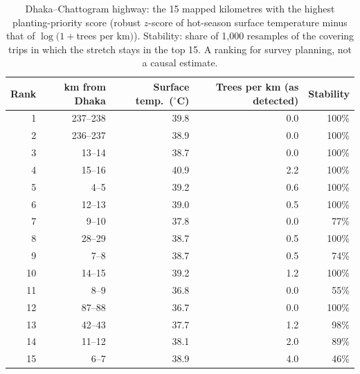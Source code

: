 \begin{table}[t]\centering\footnotesize
\caption{Dhaka--Chattogram highway: the 15 mapped kilometres with the highest planting-priority score (robust $z$-score of hot-season surface temperature minus that of $\log(1+$trees per km$)$). Stability: share of 1,000 resamples of the covering trips in which the stretch stays in the top 15. A ranking for survey planning, not a causal estimate.}\label{tab:priority}
\begin{tabular}{rrrrr}\toprule
Rank & km from Dhaka & Surface temp.\ ($^\circ$C) & Trees per km (as detected) & Stability\\\midrule
1 & 237--238 & 39.8 & 0.0 & 100\%\\
2 & 236--237 & 38.9 & 0.0 & 100\%\\
3 & 13--14 & 38.7 & 0.0 & 100\%\\
4 & 15--16 & 40.9 & 2.2 & 100\%\\
5 & 4--5 & 39.2 & 0.6 & 100\%\\
6 & 12--13 & 39.0 & 0.5 & 100\%\\
7 & 9--10 & 37.8 & 0.0 & 77\%\\
8 & 28--29 & 38.7 & 0.5 & 100\%\\
9 & 7--8 & 38.7 & 0.5 & 74\%\\
10 & 14--15 & 39.2 & 1.2 & 100\%\\
11 & 8--9 & 36.8 & 0.0 & 55\%\\
12 & 87--88 & 36.7 & 0.0 & 100\%\\
13 & 42--43 & 37.7 & 1.2 & 98\%\\
14 & 11--12 & 38.1 & 2.0 & 89\%\\
15 & 6--7 & 38.9 & 4.0 & 46\%\\
\bottomrule
\end{tabular}
\end{table}
